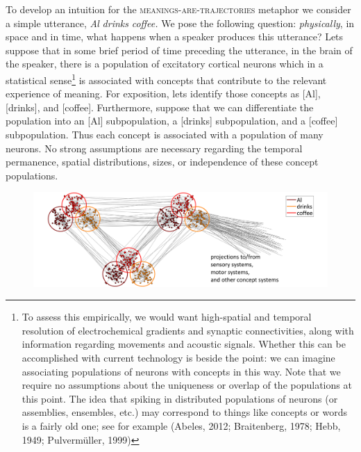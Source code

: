 To develop an intuition for the \textsc{meanings}\textsc{{}-are-}\textsc{trajectories} metaphor we consider a simple utterance, \textit{Al} \textit{drinks} \textit{coffee.} We pose the following question: \textit{physically}, in space and in time, what happens when a speaker produces this utterance? Lets suppose that in some brief period of time preceding the utterance, in the brain of the speaker, there is a population of excitatory cortical neurons which in a statistical sense\footnote{To assess this empirically, we would want high-spatial and temporal resolution of electrochemical gradients and synaptic connectivities, along with information regarding movements and acoustic signals. Whether this can be accomplished with current technology is beside the point: we can imagine associating populations of neurons with concepts in this way. Note that we require no assumptions about the uniqueness or overlap of the populations at this point. The idea that spiking in distributed populations of neurons (or assemblies, ensembles, etc.) may correspond to things like concepts or words is a fairly old one; see for example (Abeles, 2012; Braitenberg, 1978; Hebb, 1949; Pulvermüller, 1999)} is associated with concepts that contribute to the relevant experience of meaning. For exposition, lets identify those concepts as [Al], [drinks], and [coffee]. Furthermore, suppose that we can differentiate the population into an [Al] subpopulation, a [drinks] subpopulation, and a [coffee] subpopulation. Thus each concept is associated with a population of many neurons. No strong assumptions are necessary regarding the temporal permanence, spatial distributions, sizes, or independence of these concept populations.

  
\begin{figure}
\includegraphics[width=\textwidth]{figures/Tilsen-img9.png}
\caption{\missingcaption}
\label{fig:}
\end{figure}
 

